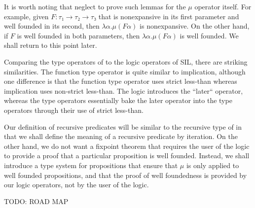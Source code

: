 \documentclass[acmsmall]{acmart}
\begin{document}
It is worth noting that \citet{Appel:2001aa} neglect to prove such 
lemmas for the $μ$ operator itself. For example, given $F : τ₁ → τ₂ → τ₃$
that is nonexpansive in its first parameter and well founded in
its second, then $λ α. μ (F α)$ is nonexpansive.
On the other hand, if $F$ is well founded in both parameters,
then $λ α. μ (F α)$ is well founded. We shall return to this point later.


Comparing the type operators of \citet{Appel:2001aa} to the logic
operators of SIL, there are striking similarities. The function type
operator is quite similar to implication, although one difference is
that the function type operator uses strict less-than whereas
implication uses non-strict less-than. The logic introduces the
``later`` operator, whereas the type operators essentially bake the
later operator into the type operators through their use of strict
less-than.

Our definition of recursive predicates will be similar to the
recursive type of \citet{Appel:2001aa} in that we shall define the
meaning of a recursive predicate by iteration.  On the other hand, we
do not want a fixpoint theorem that requires the user of the logic to
provide a proof that a particular proposition is well
founded. Instead, we shall introduce a type system for propositions
that ensure that $μ$ is only applied to well founded propositions, and
that the proof of well foundedness is provided by our logic operators,
not by the user of the logic.

TODO: ROAD MAP


\end{document}
